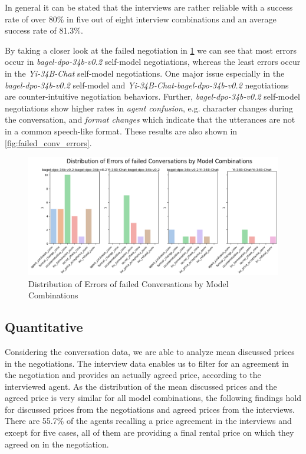 \documentclass[runningheads]{llncs}
\begin{document}
In general it can be stated that the interviews are rather reliable with a success rate of over 80\% in five out of eight interview combinations and an average success rate of 81.3\%. 

By taking a closer look at the failed negotiation in \ref{fig:bar_failed_conv_errors} we can see that most errors occur in \textit{bagel-dpo-34b-v0.2} self-model negotiations, whereas the least errors occur in the \textit{Yi-34B-Chat} self-model negotiations. One major issue especially in the \textit{bagel-dpo-34b-v0.2} self-model and \textit{Yi-34B-Chat-bagel-dpo-34b-v0.2} negotiations are counter-intuitive negotiation behaviors. Further, \textit{bagel-dpo-34b-v0.2} self-model negotiations show higher rates in \textit{agent confusion}, e.g. character changes during the conversation, and \textit{format changes} which indicate that the utterances are not in a common speech-like format. These results are also shown in \ref{fig:failed_conv_errors}.

\begin{figure}[h]
    \includegraphics[width=1\textwidth]{plots/barplot_failed_conversations_errors.png}
    \caption[eval]{Distribution of Errors of failed Conversations by Model Combinations}
    \label{fig:bar_failed_conv_errors}
\end{figure}


\subsection{Quantitative}

Considering the conversation data, we are able to analyze mean discussed prices in the negotiations. The interview data enables us to filter for an agreement in the negotiation and provides an actually agreed price, according to the interviewed agent. As the distribution of the mean discussed prices and the agreed price is very similar for all model combinations, the following findings hold for discussed prices from the negotiations and agreed prices from the interviews. There are 55.7\% of the agents recalling a price agreement in the interviews and except for five cases, all of them are providing a final rental price on which they agreed on in the negotiation.
\end{document}
